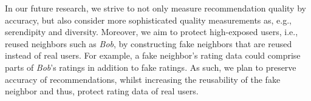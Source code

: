 \documentclass[manuscript,review,anonymous]{acmart}
\newcommand{\dk}[1]{
        \textcolor{blue}{DK: #1}}
\newcommand{\pmu}[1]{
        \textcolor{orange}{PM: #1}}
\begin{document}
In our future research, we strive to not only measure recommendation quality by accuracy, but also consider more sophisticated quality measurements as, e.g., serendipity and diversity.
Moreover, we aim to protect high-exposed users, i.e., reused neighbors such as \emph{Bob}, by constructing fake neighbors that are reused instead of real users.
For example, a fake neighbor's rating data could comprise parts of \emph{Bob}'s ratings in addition to fake ratings.
As such, we plan to preserve accuracy of recommendations, whilst increasing the reusability of the fake neighbor and thus, protect rating data of real users.









\end{document}
